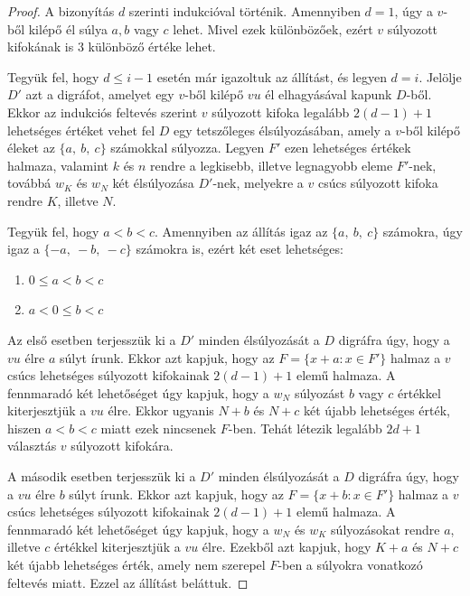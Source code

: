 \documentclass[12pt, a4paper]{report}
\theoremstyle{remark}
\theoremstyle{definition}
\begin{document}
\begin{proof}
A bizonyítás $d$ szerinti indukcióval történik. Amennyiben $d = 1$, úgy a $v$-ből kilépő él súlya $a, b$ vagy $c$ lehet. Mivel ezek különbözőek, ezért $v$ súlyozott kifokának is $3$ különböző értéke lehet.

Tegyük fel, hogy $d \leq i - 1$ esetén már igazoltuk az állítást, és legyen $d = i$. Jelölje $D'$ azt a digráfot, amelyet egy $v$-ből kilépő $vu$ él elhagyásával kapunk $D$-ből. Ekkor az indukciós feltevés szerint $v$ súlyozott kifoka legalább $2(d - 1) + 1$ lehetséges értéket vehet fel $D$ egy tetszőleges élsúlyozásában, amely a $v$-ből kilépő éleket az $\lbrace a,\ b,\ c \rbrace$ számokkal súlyozza. Legyen $F'$ ezen lehetséges értékek halmaza, valamint $k$ és $n$ rendre a legkisebb, illetve legnagyobb eleme $F'$-nek, továbbá $w_K$ és $w_N$ két élsúlyozása $D'$-nek, melyekre a $v$ csúcs súlyozott kifoka rendre $K$, illetve $N$.

Tegyük fel, hogy $a < b < c$. Amennyiben az állítás igaz az $\lbrace a,\ b,\ c \rbrace$ számokra, úgy igaz a $\lbrace -a,\ -b,\ -c \rbrace$ számokra is, ezért két eset lehetséges:

\begin{enumerate}
\item $0 \leq a < b < c$
\item $a < 0 \leq b < c$
\end{enumerate}

Az első esetben terjesszük ki a $D'$ minden élsúlyozását a $D$ digráfra úgy, hogy a $vu$ élre $a$ súlyt írunk. Ekkor azt kapjuk, hogy az $F = \lbrace x + a: x \in F' \rbrace$ halmaz a $v$ csúcs lehetséges súlyozott kifokainak $2(d - 1) + 1$ elemű halmaza. A fennmaradó két lehetőséget úgy kapjuk, hogy a $w_N$ súlyozást $b$ vagy $c$ értékkel kiterjesztjük a $vu$ élre. Ekkor ugyanis $N + b$ és $N + c$ két újabb lehetséges érték, hiszen $a < b < c$ miatt ezek nincsenek $F$-ben. Tehát létezik legalább $2d + 1$ választás $v$ súlyozott kifokára.

A második esetben terjesszük ki a $D'$ minden élsúlyozását a $D$ digráfra úgy, hogy a $vu$ élre $b$ súlyt írunk. Ekkor azt kapjuk, hogy az $F = \lbrace x + b: x \in F' \rbrace$ halmaz a $v$ csúcs lehetséges súlyozott kifokainak $2(d - 1) + 1$ elemű halmaza. A fennmaradó két lehetőséget úgy kapjuk, hogy a $w_N$ és $w_K$ súlyozásokat rendre $a$, illetve $c$ értékkel kiterjesztjük a $vu$ élre. Ezekből azt kapjuk, hogy $K + a$ és $N + c$ két újabb lehetséges érték, amely nem szerepel $F$-ben a súlyokra vonatkozó feltevés miatt. Ezzel az állítást beláttuk.
\end{proof}
\end{document}
